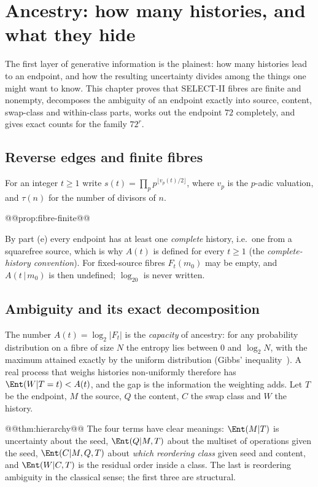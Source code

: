 \chapter{Ancestry: how many histories, and what they hide}\label{ch:ancestry}

The first layer of generative information is the plainest: how many histories lead to an endpoint, and how the resulting uncertainty divides among the things one might want to know. This chapter proves that SELECT-II fibres are finite and nonempty, decomposes the ambiguity of an endpoint exactly into source, content, swap-class and within-class parts, works out the endpoint $72$ completely, and gives exact counts for the family $72^r$.

\section{Reverse edges and finite fibres}
For an integer $t\ge1$ write $s(t)=\prod_p p^{\lfloor v_p(t)/2\rfloor}$, where $v_p$ is the $p$-adic valuation, and $\tau(n)$ for the number of divisors of $n$.

@@prop:fibre-finite@@

By part (e) every endpoint has at least one \emph{complete} history, i.e.\ one from a squarefree source, which is why $A(t)$ is defined for every $t\ge1$ (the \emph{complete-history convention}). For fixed-source fibres $F_t(m_0)$ may be empty, and $A(t\,|\,m_0)$ is then undefined; $\log_20$ is never written.

\section{Ambiguity and its exact decomposition}
The number $A(t)=\log_2|F_t|$ is the \emph{capacity} of ancestry: for any probability distribution on a fibre of size $N$ the entropy lies between $0$ and $\log_2N$, with the maximum attained exactly by the uniform distribution (Gibbs' inequality~\cite{CoverThomas}). A real process that weighs histories non-uniformly therefore has $\Ent(W|T=t)<A(t)$, and the gap is the information the weighting adds. Let $T$ be the endpoint, $M$ the source, $Q$ the content, $C$ the swap class and $W$ the history.

@@thm:hierarchy@@
The four terms have clear meanings: $\Ent(M|T)$ is uncertainty about the seed, $\Ent(Q|M,T)$ about the multiset of operations given the seed, $\Ent(C|M,Q,T)$ about \emph{which reordering class} given seed and content, and $\Ent(W|C,T)$ is the residual order inside a class. The last is reordering ambiguity in the classical sense; the first three are structural.

